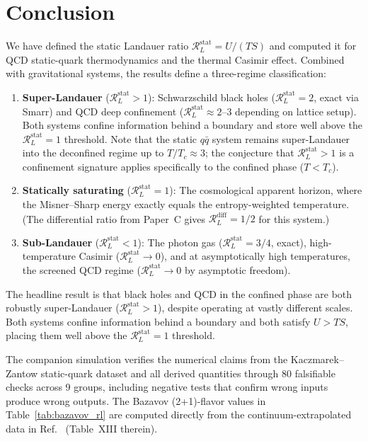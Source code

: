 \documentclass[%
 aip,
 amsmath,amssymb,
 reprint,%
]{revtex4-2}
\newcommand{\RLs}{\mathcal{R}_L^{\mathrm{stat}}}
\newcommand{\RLd}{\mathcal{R}_L^{\mathrm{diff}}}
\begin{document}
\section{Conclusion}
\label{sec:conclusion}

We have defined the static Landauer ratio $\RLs = U/(TS)$
and computed it for QCD static-quark thermodynamics and the thermal
Casimir effect.
Combined with gravitational systems, the results define a
three-regime classification:

\begin{enumerate}
\item \textbf{Super-Landauer} ($\RLs > 1$):
Schwarzschild black holes ($\RLs = 2$, exact via Smarr) and
QCD deep confinement ($\RLs \approx 2$--$3$ depending on
lattice setup).  Both systems confine information behind a boundary
and store well above the $\RLs = 1$ threshold.  Note that the
static $q\bar{q}$ system remains super-Landauer into the
deconfined regime up to $T/T_c \approx 3$; the conjecture that
$\RLs > 1$ is a confinement signature applies specifically to
the confined phase ($T < T_c$).

\item \textbf{Statically saturating} ($\RLs = 1$):
The cosmological apparent horizon, where the Misner--Sharp energy
exactly equals the entropy-weighted temperature.  (The differential
ratio from Paper~C gives $\RLd = 1/2$ for this system.)

\item \textbf{Sub-Landauer} ($\RLs < 1$):
The photon gas ($\RLs = 3/4$, exact), high-temperature
Casimir ($\RLs \to 0$), and at asymptotically high
temperatures, the screened QCD regime
($\RLs \to 0$ by asymptotic freedom).
\end{enumerate}

The headline result is that black holes and QCD in the confined phase
are both robustly super-Landauer ($\RLs > 1$), despite operating at
vastly different scales.  Both systems confine information behind a
boundary and both satisfy $U > TS$, placing them well above the
$\RLs = 1$ threshold.

The companion simulation verifies the numerical claims from the
Kaczmarek--Zantow static-quark dataset and all derived quantities
through 80 falsifiable checks across 9 groups, including negative
tests that confirm wrong inputs produce wrong outputs.  The Bazavov
(2+1)-flavor values in Table~\ref{tab:bazavov_rl} are computed
directly from the continuum-extrapolated data in
Ref.~\cite{Bazavov2016} (Table~XIII therein).
\end{document}
